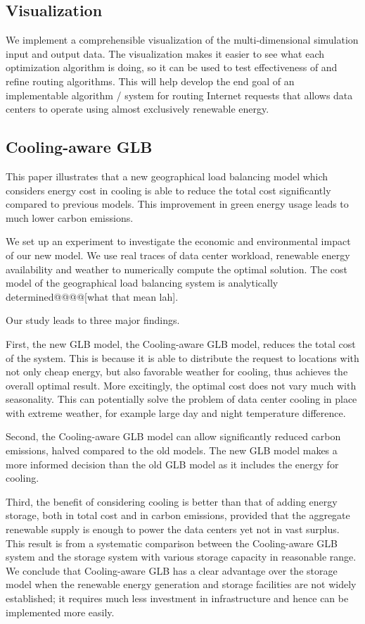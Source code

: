 \documentclass{acm_proc_article-sp}
\begin{document}
\subsection{Visualization}
We implement a comprehensible visualization of the multi-dimensional simulation input and output data. The visualization makes it easier to see what each optimization algorithm is doing, so it can be used to test effectiveness of and refine routing algorithms. This will help develop the end goal of an implementable algorithm / system for routing Internet requests that allows data centers to operate using almost exclusively renewable energy.

\subsection{Cooling-aware GLB}

This paper illustrates that a new geographical load balancing model which considers energy cost in cooling is able to reduce the total cost significantly compared to previous models. This improvement in green energy usage leads to much lower carbon emissions.

We set up an experiment to investigate the economic and environmental impact of our new model. We use real traces of data center workload, renewable energy availability and weather to numerically compute the optimal solution. The cost model of the geographical load balancing system is analytically determined@@@@[what that mean lah].

Our study leads to three major findings.

First, the new GLB model, the Cooling-aware GLB model, reduces the total cost of the system. This is because it is able to distribute the request to locations with not only cheap energy, but also favorable weather for cooling, thus achieves the overall optimal result. More excitingly, the optimal cost does not vary much with seasonality. This can potentially solve the problem of data center cooling in place with extreme weather, for example large day and night temperature difference.

Second, the Cooling-aware GLB model can allow significantly reduced carbon emissions, halved compared to the old models. The new GLB model makes a more informed decision than the old GLB model as it includes the energy for cooling.

Third, the benefit of considering cooling is better than that of adding energy storage, both in total cost and in carbon emissions, provided that the aggregate renewable supply is enough to power the data centers yet not in vast surplus. This result is from a systematic comparison between the Cooling-aware GLB system and the storage system with various storage capacity in reasonable range. We conclude that Cooling-aware GLB has a clear advantage over the storage model when the renewable energy generation and storage facilities are not widely established; it requires much less investment in infrastructure and hence can be implemented more easily.
\end{document}
